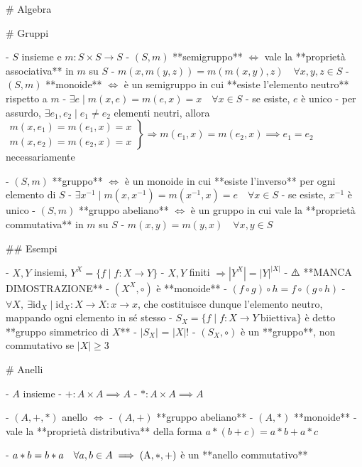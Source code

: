 # Algebra

# Gruppi

- $S$ insieme e $m: S \times S \rightarrow S$
  - $(S, m)$ **semigruppo** $\iff$ vale la **proprietà associativa** in $m$ su $S$
    - $m(x, m(y, z))=m(m(x, y),z) \quad \forall x, y, z \in S$
  - $(S, m)$ **monoide** $\iff$ è un semigruppo in cui **esiste l'elemento neutro** rispetto a $m$
    - $\exists e  \mid m(x, e) = m(e, x) = x \quad \forall x \in S$
    - se esiste, $e$ è unico
        - per assurdo, $\exists e_1, e_2 \mid e_1 \neq e_2$ elementi neutri, allora \( \left.\begin{array}{l}m\left(x, e_{1}\right)=m\left(e_{1}, x\right)=x \\ m\left(x, e_{2}\right)=m\left(e_{2}, x\right)=x\end{array}\right\} \Rightarrow m\left(e_{1}, x\right)=m\left(e_{2}, x\right) \implies e_1=e_2\) necessariamente

  - $(S, m)$ **gruppo** $\iff$ è un monoide in cui **esiste l'inverso** per ogni elemento di $S$
    - $\exists x^{-1} \mid m(x, x^{-1}) =m(x^{-1}, x) =e \quad \forall x \in S$
    - se esiste, $x^{-1}$ è unico
  - $(S, m)$ **gruppo abeliano** $\iff$ è un gruppo in cui vale la **proprietà commutativa** in $m$ su $S$
    - $m(x, y) = m(y, x) \quad \forall x, y \in S$

## Esempi

- $X, Y$ insiemi, $Y^X = \{f \mid f:X \rightarrow Y\}$
  - $X, Y$ finiti $\Rightarrow \left| Y^X \right| = \left| Y \right| ^ {|X|}$
      - ⚠️ **MANCA DIMOSTRAZIONE**
  - $(X^X, \circ)$ è **monoide**
    - \( (f \circ g) \circ h=f \circ(g \circ h) \)
    - $\forall X, \ \exists \textrm{id}_X \mid \textrm{id}_X : X \rightarrow X : x \rightarrow x$, che costituisce dunque l'elemento neutro, mappando ogni elemento in sé stesso
  - $S_X = \{f \mid f : X \rightarrow Y \ \textrm{biiettiva}\}$ è detto **gruppo simmetrico di $X$**
    - $|S_X|$ = $|X|!$
    - $(S_X, \circ)$ è un **gruppo**, non commutativo se $|X| \ge 3$

# Anelli

- $A$ insieme
- $+: A \times A \implies A$
- \( *: A \times A \implies A \)

- \( (A, +, *) \) anello \(\iff  \)
  - $(A, +)$ **gruppo abeliano**
  - $(A, *)$ **monoide**
  - vale la **proprietà distributiva** della forma \(a*(b + c) = a * b + a * c\)

- \( a * b=b * a \quad \forall a, b \in A \implies  \rm (A, *, +)\) è un **anello commutativo**

